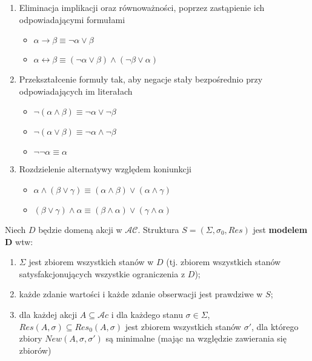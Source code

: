 \documentclass[11pt,a4paper]{article}
\begin{document}
\begin{enumerate}
	\item Eliminacja implikacji oraz równoważności, poprzez zastąpienie ich 			odpowiadającymi formułami 
		\begin{itemize}
			\item $\alpha \rightarrow \beta \equiv \neg\alpha \vee \beta$
			\item $\alpha \leftrightarrow \beta \equiv (\neg\alpha \vee \beta) \wedge (\neg\beta \vee \alpha)$
		\end{itemize}
	\item Przekształcenie formuły tak, aby negacje stały bezpośrednio przy odpowiadających im literałach
		\begin{itemize}
			\item $\neg(\alpha \wedge \beta) \equiv \neg\alpha \vee \neg\beta$
			\item $\neg(\alpha \vee \beta) \equiv \neg\alpha \wedge \neg\beta$
			\item $\neg\neg\alpha \equiv \alpha$
		\end{itemize}
		\item Rozdzielenie alternatywy względem koniunkcji
		\begin{itemize}
			\item $\alpha \wedge (\beta \vee \gamma) \equiv (\alpha \wedge \beta) \vee (\alpha \wedge \gamma)$
			\item $(\beta \vee \gamma) \wedge \alpha \equiv (\beta \wedge \alpha) \vee (\gamma \wedge \alpha)$
		\end{itemize}
\end{enumerate}




Niech $D$ będzie domeną akcji w $\mathcal{AC}$. Struktura $S = (\Sigma,\sigma_0,Res)$ jest \textbf{modelem D} wtw:
\begin{enumerate}
\item $\Sigma$ jest zbiorem wszystkich stanów w $D$ (tj. zbiorem wszystkich stanów satysfakcjonujących wszystkie ograniczenia z $D$);
\item każde zdanie wartości i każde zdanie obserwacji jest prawdziwe w $S$;
\item dla każdej akcji $A \subseteq \mathcal{A}c$ i dla każdego stanu $\sigma \in \Sigma$, $Res(A,\sigma) \subseteq Res_0(A,\sigma)$ jest zbiorem wszystkich stanów $\sigma'$, dla którego zbiory $New(A,\sigma,\sigma')$ są minimalne (mając na względzie zawierania się zbiorów)
\end{enumerate}
\end{document}
